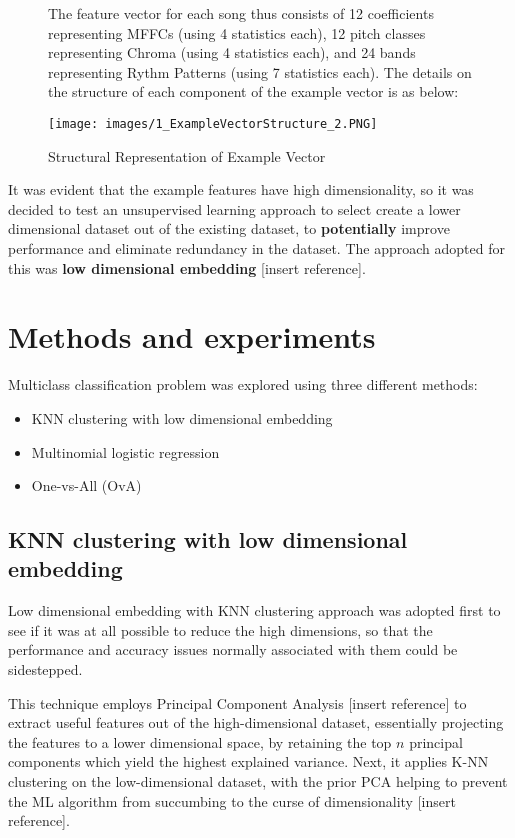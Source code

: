 \documentclass[journal]{IEEEtran}
\begin{document}
\begin{figure}[h!]
The feature vector for each song thus consists of 12 coefficients representing MFFCs (using 4 statistics each), 12 pitch classes representing Chroma (using 4 statistics each), and 24 bands representing Rythm Patterns (using 7 statistics each). The details on the structure of each component of the example vector is as below: \par
\begin{center}
	\texttt{[image: images/1\_ExampleVectorStructure\_2.PNG]}
	\caption{Structural Representation of Example Vector}
	\label{fig:Fig.2}
\end{center}
\end{figure}

It was evident that the example features have high dimensionality, so it was decided to test an unsupervised learning approach to select create a lower dimensional dataset out of the existing dataset, to \textbf{potentially} improve performance and eliminate redundancy in the dataset. The approach adopted for this was \textbf{low dimensional embedding} [insert reference]. \par

\section{Methods and experiments}
Multiclass classification problem was explored using three different methods: \par
\begin{itemize}
	\item KNN clustering with low dimensional embedding
	\item Multinomial logistic regression
	\item One-vs-All (OvA)
\end{itemize}

\subsection{KNN clustering with low dimensional embedding}
Low dimensional embedding with KNN clustering approach was adopted first to see if it was at all possible to reduce the high dimensions, so that the performance and accuracy issues normally associated with them could be sidestepped.\par

This technique employs Principal Component Analysis [insert reference] to extract useful features out of the high-dimensional dataset, essentially projecting the features to a lower dimensional space, by retaining the top $n$ principal components which yield the highest explained variance. Next, it applies K-NN clustering on the low-dimensional dataset, with the prior PCA helping to prevent the ML algorithm from succumbing to the curse of dimensionality [insert reference]. \par
\end{document}
